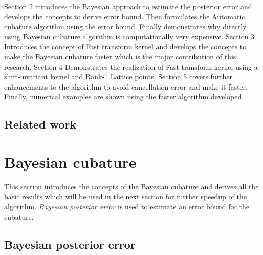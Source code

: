 \documentclass[smallextended]{svjour3}       %
\begin{document}
Section 2 introduces the Bayesian approach to estimate the posterior error and develops the concepts to derive error bound. Then formulates the Automatic cubature algorithm using the error bound. Finally demonstrates why directly using Bayesian cubature algorithm is computationally very expensive.
Section 3 Introduces the concept of Fast transform kernel and develops the concepts to make the Bayesian cubature faster which is the major contribution of this research.
Section 4 Demonstrates the realization of Fast transform kernel using a shift-invariant kernel and Rank-1 Lattice points.
Section 5 covers further enhancements to the algorithm to avoid cancellation error and make it faster. Finally, numerical examples are shown using the faster algorithm developed.



\subsection{Related work}



\section{Bayesian cubature}
\label{sec:1}

This section introduces the concepts of the Bayesian cubature and derives all the basic results which will be used in the next section for further speedup of the algorithm. \emph{Bayesian posterior error} \cite{Fred2017} is used to estimate an error bound for the cubature. 

\subsection{Bayesian posterior error}
\label{sec:2}

\end{document}
